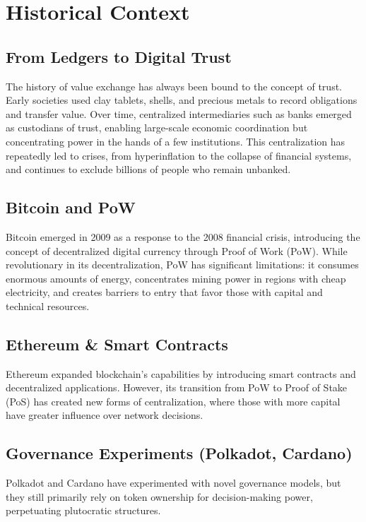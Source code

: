 \documentclass[11pt,a4paper]{article}
\begin{document}

\section{Historical Context}

\subsection{From Ledgers to Digital Trust}
The history of value exchange has always been bound to the concept of trust. Early societies used clay tablets, shells, and precious metals to record obligations and transfer value. Over time, centralized intermediaries such as banks emerged as custodians of trust, enabling large-scale economic coordination but concentrating power in the hands of a few institutions. This centralization has repeatedly led to crises, from hyperinflation to the collapse of financial systems, and continues to exclude billions of people who remain unbanked.

\subsection{Bitcoin and PoW}
Bitcoin emerged in 2009 as a response to the 2008 financial crisis, introducing the concept of decentralized digital currency through Proof of Work (PoW). While revolutionary in its decentralization, PoW has significant limitations: it consumes enormous amounts of energy, concentrates mining power in regions with cheap electricity, and creates barriers to entry that favor those with capital and technical resources.

\subsection{Ethereum \& Smart Contracts}
Ethereum expanded blockchain's capabilities by introducing smart contracts and decentralized applications. However, its transition from PoW to Proof of Stake (PoS) has created new forms of centralization, where those with more capital have greater influence over network decisions.

\subsection{Governance Experiments (Polkadot, Cardano)}
Polkadot and Cardano have experimented with novel governance models, but they still primarily rely on token ownership for decision-making power, perpetuating plutocratic structures.
\end{document}
